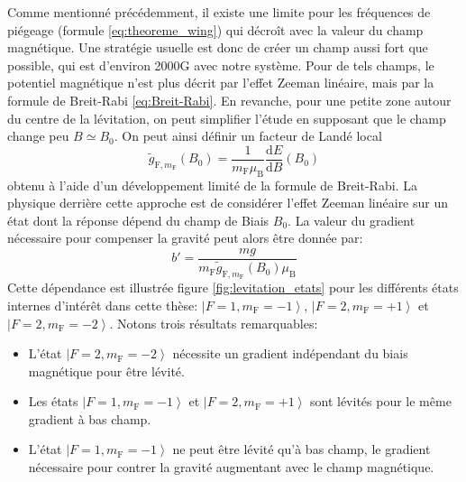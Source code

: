 Comme mentionné précédemment, il existe une limite pour les fréquences de piégeage (formule \ref{eq:theoreme_wing}) qui décroît avec la valeur du champ magnétique. Une stratégie usuelle est donc de créer un champ aussi fort que possible, qui est d'environ 2000G avec notre système. Pour de tels champs, le potentiel magnétique n'est plus décrit par l'effet Zeeman linéaire, mais par la formule de Breit-Rabi \ref{eq:Breit-Rabi}. En revanche, pour une petite zone autour du centre de la lévitation, on peut simplifier l'étude en supposant que le champ change peu $B\simeq B_0$. On peut ainsi définir un facteur de Landé local
\begin{equation}
\widetilde{g}_{\mathrm{F},m_{\mathrm{F}}}(B_0)=\frac{1}{m_{\mathrm{F}} \mu_{\mathrm{B}}} \frac{\mathrm{d}E}{\mathrm{d}B}(B_0)
\end{equation}
obtenu à l'aide d'un développement limité de la formule de Breit-Rabi. La physique derrière cette approche est de considérer l'effet Zeeman linéaire sur un état dont la réponse dépend du champ de Biais $B_0$. La valeur du gradient nécessaire pour compenser la gravité peut alors être donnée par:
\begin{equation}
b'=\frac{mg}{m_{\mathrm{F}} \widetilde{g}_{\mathrm{F},m_{\mathrm{F}}}(B_0) \mu_{\mathrm{B}}}
\end{equation}
Cette dépendance est illustrée figure \ref{fig:levitation_etats} pour les différents états internes d'intérêt dans cette thèse: $\left| F=1,m_{\mathrm{F}}=-1 \right\rangle$, $\left| F=2, m_{\mathrm{F}}=+1 \right\rangle$ et $\left| F=2, m_{\mathrm{F}}=-2 \right\rangle$. Notons trois résultats remarquables: 
\begin{itemize}
\item[\textendash] L'état $\left| F=2, m_{\mathrm{F}}=-2 \right\rangle$ nécessite un gradient indépendant du biais magnétique pour être lévité.
\item[\textendash] Les états $\left| F=1, m_{\mathrm{F}}=-1 \right\rangle$ et $\left| F=2,m_{\mathrm{F}}=+1 \right\rangle$ sont lévités pour le même gradient à bas champ.
\item[\textendash] L'état $\left| F=1,m_{\mathrm{F}}=-1 \right\rangle$ ne peut être lévité qu'à bas champ, le gradient nécessaire pour contrer la gravité augmentant avec le champ magnétique.
\end{itemize}


